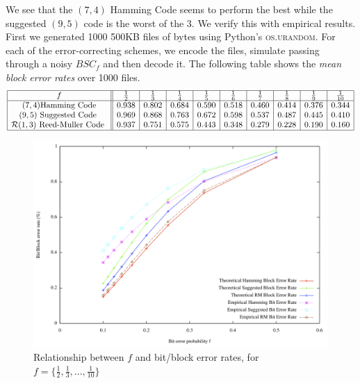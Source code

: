 \documentclass[12pt, a4paper]{article}
\begin{document}
We see that the $(7,4)$ Hamming Code seems to perform the best while the suggested $(9,5)$ code is the worst of the 3. We verify this with empirical results. First we generated 1000 500KB files of bytes using Python's \textsc{os.urandom}. For each of the error-correcting schemes, we encode the files, simulate passing through a noisy $BSC_f$ and then decode it. The following table shows the \textit{mean block error rates} over 1000 files.
$$
\begin{array}{|c||c|c|c|c|c|c|c|c|c|}
\hline
f & \frac{1}{2} & \frac{1}{3} & \frac{1}{4} & \frac{1}{5} & \frac{1}{6} & \frac{1}{7} & \frac{1}{8} & \frac{1}{9} & \frac{1}{10}\\
\hline
(7,4) \text{Hamming Code} & 0.938 & 0.802 & 0.684 & 0.590 & 0.518 & 0.460 & 0.414 & 0.376 & 0.344\\
(9,5) \text{ Suggested Code } & 0.969 & 0.868 & 0.763 & 0.672 & 0.598 & 0.537 & 0.487 & 0.445 & 0.410\\
\mathcal{R}(1,3) \text{ Reed-Muller Code } & 0.937 & 0.751 & 0.575 & 0.443 & 0.348 & 0.279 & 0.228 & 0.190 & 0.160\\
\hline
\end{array}
$$


\begin{figure}[H]
	\centering
	\includegraphics[width=\textwidth]{results.png}
	\caption{Relationship between $f$ and bit/block error rates, for $f = \{\frac{1}{2}, \frac{1}{3}, ... , \frac{1}{10}\}$}
\end{figure}
\end{document}
